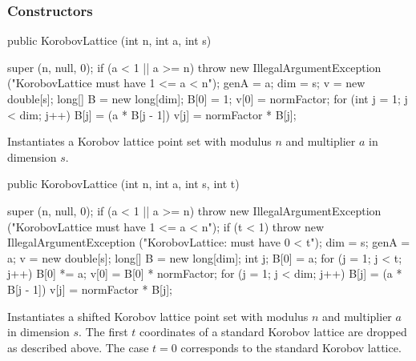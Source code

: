 \subsubsection*{Constructors}
\begin{code}
   public KorobovLattice (int n, int a, int s) \begin{hide} {
      super (n, null, 0);
      if (a < 1 || a >= n) 
         throw new IllegalArgumentException 
            ("KorobovLattice must have 1 <= a < n");
      genA = a;
      dim = s;
      v = new double[s];
      long[] B = new long[dim];
      B[0] = 1;
      v[0] = normFactor;
      for (int j = 1; j < dim; j++) {
         B[j] = (a * B[j - 1]) %
         v[j] = normFactor * B[j];
      }
   }\end{hide}
\end{code}
 \begin{tabb}
   Instantiates a Korobov lattice point set with modulus $n$ and 
   multiplier $a$ in dimension $s$.
 \end{tabb}
\begin{code}

   public KorobovLattice (int n, int a, int s, int t) \begin{hide} {
      super (n, null, 0);
      if (a < 1 || a >= n) 
         throw new IllegalArgumentException 
            ("KorobovLattice must have 1 <= a < n");
      if (t < 1) 
         throw new IllegalArgumentException 
            ("KorobovLattice: must have 0 < t");
      dim = s;
      genA = a;
      v = new double[s];
      long[] B = new long[dim];
      int j;
      B[0] = a;
      for (j = 1; j < t; j++)
         B[0] *= a;
      v[0] = B[0] * normFactor;
      for (j = 1; j < dim; j++) {
         B[j] = (a * B[j - 1]) %
         v[j] = normFactor * B[j];
      }
   }\end{hide}
\end{code}
 \begin{tabb}
   Instantiates a shifted Korobov lattice point set with modulus $n$ and 
   multiplier $a$ in dimension $s$. The first $t$ coordinates of a
   standard Korobov lattice are dropped as described above.
   The case $t=0$ corresponds to the standard  Korobov lattice.
 \end{tabb}

